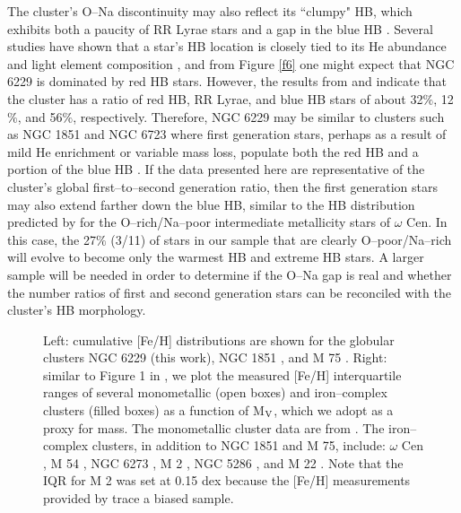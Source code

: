 \documentclass[12pt,preprint]{emulateapj}
\begin{document}
The cluster's O--Na discontinuity may also reflect its ``clumpy" HB, which 
exhibits both a paucity of RR Lyrae stars and a gap in the blue HB 
\citep[e.g.,][]{Catelan98,Borissova99}.  Several studies have shown that a 
star's HB location is closely tied to its He abundance and light element 
composition \citep[e.g.,][]{Gratton11,Marino11c,Gratton12b,Villanova12,
Marino14,Gratton15}, and from Figure \ref{f6} one might expect that NGC 6229
is dominated by red HB stars.  However, the results from \citet{Borissova97} 
and \citet{Catelan98} indicate that the cluster has a ratio of red HB, RR 
Lyrae, and blue HB stars of about 32$\%$, 12$\%$, and 56$\%$, respectively.  
Therefore, NGC 6229 may be similar to clusters such as NGC 1851 and NGC 6723
where first generation stars, perhaps as a result of mild He enrichment or 
variable mass loss, populate both the red HB and a portion of the blue HB
\citep{Gratton12b,Gratton15}.  If the data presented here are representative
of the cluster's global first--to--second generation ratio, then the first
generation stars may also extend farther down the blue HB, similar to the
HB distribution predicted by \citet{Tailo16} for the O--rich/Na--poor 
intermediate metallicity stars of $\omega$ Cen.  In this case, the 27$\%$ 
(3/11) of stars in our sample that are clearly O--poor/Na--rich will evolve to 
become only the warmest HB and extreme HB stars.  A larger sample will be 
needed in order to determine if the O--Na gap is real and whether the number 
ratios of first and second generation stars can be reconciled with the 
cluster's HB morphology.

\begin{figure*}
\caption{Left: cumulative [Fe/H] distributions are shown for the
globular clusters NGC 6229 (this work), NGC 1851 \citep{Carretta11}, and
M 75 \citep{Kacharov13}.  Right: similar to Figure 1 in \citet{DaCosta16}, we
plot the measured [Fe/H] interquartile ranges of several monometallic (open
boxes) and iron--complex clusters (filled boxes) as a function of M$_{\rm V}$,
which we adopt as a proxy for mass.  The monometallic cluster data are from
\citet{Carretta09b}.  The iron--complex clusters, in addition to NGC 1851 and
M 75, include: $\omega$ Cen \citep{Johnson10}, M 54 \citep{Carretta10a},
NGC 6273 \citep{Johnson17a}, M 2 \citep{Yong14}, NGC 5286 \citep{Marino15},
and M 22 \citep{Marino11b}.  Note that the IQR for M 2 was set at 0.15 dex
because the [Fe/H] measurements provided by \citet{Yong14} trace a biased
sample.}
\label{f7}
\end{figure*}
\end{document}
